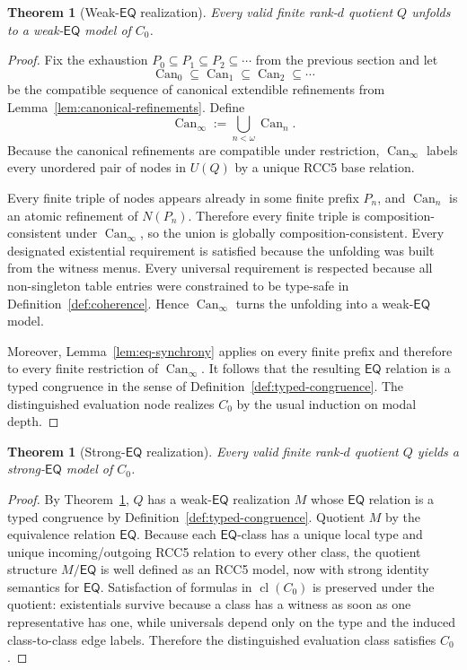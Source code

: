\documentclass[11pt]{article}
\newtheorem{theorem}[definition]{Theorem}
\theoremstyle{remark}
\newcommand{\EQ}{\mathsf{EQ}}
\newcommand{\cl}{\operatorname{cl}}
\newcommand{\Can}{\operatorname{Can}}
\begin{document}
\begin{theorem}[Weak-$\EQ$ realization]\label{thm:weak-model}
Every valid finite rank-$d$ quotient $Q$ unfolds to a weak-$\EQ$ model of $C_0$.
\end{theorem}

\begin{proof}
Fix the exhaustion $P_0\subseteq P_1\subseteq P_2\subseteq\cdots$ from the previous section and let
\[
\Can_0\subseteq \Can_1\subseteq \Can_2\subseteq\cdots
\]
be the compatible sequence of canonical extendible refinements from Lemma~\ref{lem:canonical-refinements}. Define
\[
\Can_\infty:=\bigcup_{n<\omega}\Can_n.
\]
Because the canonical refinements are compatible under restriction, $\Can_\infty$ labels every unordered pair of nodes in $U(Q)$ by a unique RCC5 base relation.

Every finite triple of nodes appears already in some finite prefix $P_n$, and $\Can_n$ is an atomic refinement of $N(P_n)$. Therefore every finite triple is composition-consistent under $\Can_\infty$, so the union is globally composition-consistent. Every designated existential requirement is satisfied because the unfolding was built from the witness menus. Every universal requirement is respected because all non-singleton table entries were constrained to be type-safe in Definition~\ref{def:coherence}. Hence $\Can_\infty$ turns the unfolding into a weak-$\EQ$ model.

Moreover, Lemma~\ref{lem:eq-synchrony} applies on every finite prefix and therefore to every finite restriction of $\Can_\infty$. It follows that the resulting $\EQ$ relation is a typed congruence in the sense of Definition~\ref{def:typed-congruence}. The distinguished evaluation node realizes $C_0$ by the usual induction on modal depth.
\end{proof}

\begin{theorem}[Strong-$\EQ$ realization]\label{thm:strong-model}
Every valid finite rank-$d$ quotient $Q$ yields a strong-$\EQ$ model of $C_0$.
\end{theorem}

\begin{proof}
By Theorem~\ref{thm:weak-model}, $Q$ has a weak-$\EQ$ realization $M$ whose $\EQ$ relation is a typed congruence by Definition~\ref{def:typed-congruence}. Quotient $M$ by the equivalence relation $\EQ$. Because each $\EQ$-class has a unique local type and unique incoming/outgoing RCC5 relation to every other class, the quotient structure $M/{\EQ}$ is well defined as an RCC5 model, now with strong identity semantics for $\EQ$. Satisfaction of formulas in $\cl(C_0)$ is preserved under the quotient: existentials survive because a class has a witness as soon as one representative has one, while universals depend only on the type and the induced class-to-class edge labels. Therefore the distinguished evaluation class satisfies $C_0$.
\end{proof}
\end{document}
